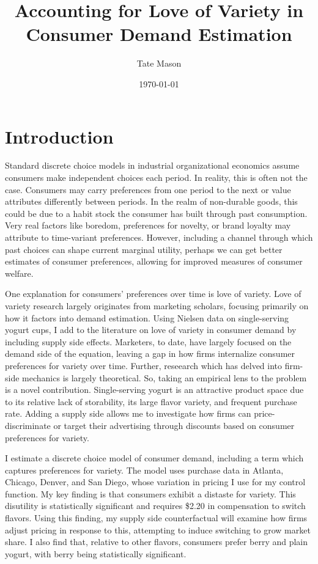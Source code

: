 \documentclass[11pt]{article}
\title{Accounting for Love of Variety in Consumer Demand Estimation}
\author{Tate Mason}
\date{\today}
\theoremstyle{definition}
\theoremstyle{remark}
\begin{document}
\maketitle
\thispagestyle{empty}
\newpage

\section{Introduction}

Standard discrete choice models in industrial organizational economics assume consumers make independent choices each period. In reality, this is often not the case. Consumers may carry preferences from one period to the next or value attributes differently between periods. In the realm of non-durable goods, this could be due to a habit stock the consumer has built through past consumption. Very real factors like boredom, preferences for novelty, or brand loyalty may attribute to time-variant preferences. However, including a channel through which past choices can shape current marginal utility, perhaps we can get better estimates of consumer preferences, allowing for improved measures of consumer welfare. 

One explanation for consumers' preferences over time is love of variety. Love of variety research largely originates from marketing scholars, focusing primarily on how it factors into demand estimation. Using Nielsen data on single-serving yogurt cups, I add to the literature on love of variety in consumer demand by including supply side effects. Marketers, to date, have largely focused on the demand side of the equation, leaving a gap in how firms internalize consumer preferences for variety over time. Further, reseearch which has delved into firm-side mechanics is largely theoretical. So, taking an empirical lens to the problem is a novel contribution. Single-serving yogurt is an attractive product space due to its relative lack of storability, its large flavor variety, and frequent purchase rate. Adding a supply side allows me to investigate how firms can price-discriminate or target their advertising through discounts based on consumer preferences for variety. 

I estimate a discrete choice model of consumer demand, including a term which captures preferences for variety. The model uses purchase data in Atlanta, Chicago, Denver, and San Diego, whose variation in pricing I use for my control function. My key finding is that consumers exhibit a distaste for variety. This disutility is statistically significant and requires \$2.20 in compensation to switch flavors. Using this finding, my supply side counterfactual will examine how firms adjust pricing in response to this, attempting to induce switching to grow market share. I also find that, relative to other flavors, consumers prefer berry and plain yogurt, with berry being statistically significant.
\end{document}
